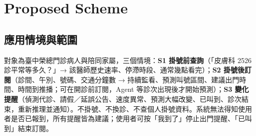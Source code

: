 \documentclass[11pt,twocolumn]{article}
\begin{document}
\section{Proposed Scheme}

\subsection{應用情境與範圍}
對象為臺中榮總門診病人與陪同家屬，三個情境：\textbf{S1 掛號前查詢}（「皮膚科 2526 診平常等多久？」→ 該醫師歷史速率、停滯時段、通常幾點看完）；\textbf{S2 掛號後訂閱}（診間、午別、號碼、交通分鐘數 → 持續監看、預測叫號區間、建議出門時間、時間到推播；可在開診前訂閱，Agent 等診次出現後才開始預測）；\textbf{S3 變化提醒}（偵測代診、請假／延誤公告、速度異常、預測大幅改變、已叫到、診次結束，重新推理並通知）。不掛號、不換診、不查個人掛號資料。系統無法得知使用者是否已報到，所有提醒皆為建議；使用者可按「我到了」停止出門提醒、「已叫到」結束訂閱。
\end{document}
